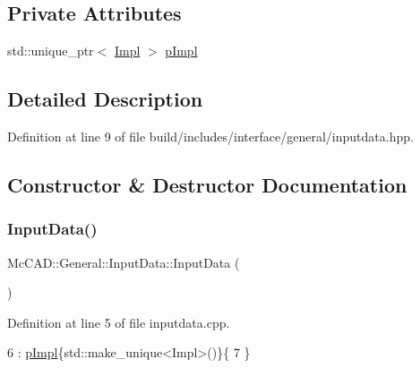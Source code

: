 \subsection*{Private Attributes}
\begin{DoxyCompactItemize}
\item 
std\+::unique\+\_\+ptr$<$ \hyperlink{classMcCAD_1_1General_1_1InputData_1_1Impl}{Impl} $>$ \hyperlink{classMcCAD_1_1General_1_1InputData_a6a636f3d471d293dcb12c59d29af50c9}{p\+Impl}
\end{DoxyCompactItemize}


\subsection{Detailed Description}


Definition at line 9 of file build/includes/interface/general/inputdata.\+hpp.



\subsection{Constructor \& Destructor Documentation}
\mbox{\label{classMcCAD_1_1General_1_1InputData_a73842cb82b9c9992dee53ba766a5994c}} 
\subsubsection{\texorpdfstring{Input\+Data()}{InputData()}\hspace{0.1cm}{\footnotesize\ttfamily [1/6]}}
{\footnotesize\ttfamily Mc\+C\+A\+D\+::\+General\+::\+Input\+Data\+::\+Input\+Data (\begin{DoxyParamCaption}{ }\end{DoxyParamCaption})}



Definition at line 5 of file inputdata.\+cpp.


\begin{DoxyCode}
6     : \hyperlink{classMcCAD_1_1General_1_1InputData_a6a636f3d471d293dcb12c59d29af50c9}{pImpl}\{std::make\_unique<Impl>()\}\{
7 \}
\end{DoxyCode}
\mbox{\label{classMcCAD_1_1General_1_1InputData_a1f1ffe8e5b1226b01da7916bdf5b59eb}} 
